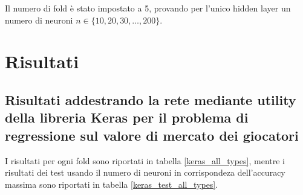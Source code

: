 \documentclass[12pt]{report}
\begin{document}
Il numero di fold è stato impostato a 5, provando per l'unico hidden layer un numero di neuroni $n \in \{10, 20, 30, \dots, 200\}$.
\newpage
\section{Risultati}

\subsection{Risultati addestrando la rete mediante utility della libreria Keras per il problema di regressione sul valore di mercato dei giocatori}

I risultati per ogni fold sono riportati in tabella \ref{keras_all_types}, mentre i risultati dei test usando il numero di neuroni in corrispondeza dell'accuracy massima sono riportati in tabella \ref{keras_test_all_types}. 
\null\par\null
\end{document}
